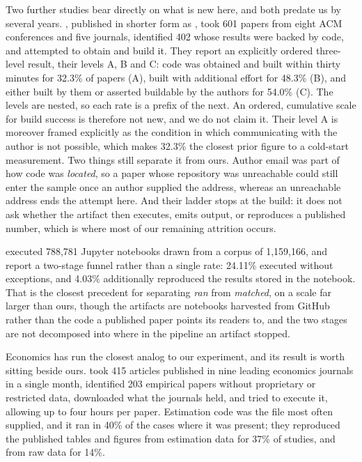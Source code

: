 Two further studies bear directly on what is new here, and both predate us by
several years. \citet{Collberg2015}, published in shorter form as
\citet{CollbergProebsting2016}, took 601 papers from eight ACM conferences and
five journals, identified 402 whose results were backed by code, and attempted to
obtain and build it. They report an explicitly ordered three-level result, their
levels A, B and C: code was obtained and built within thirty minutes for 32.3\%
of papers (A), built with additional effort for 48.3\% (B), and either built by
them or asserted buildable by the authors for 54.0\% (C). The levels are nested,
so each rate is a prefix of the next. An ordered, cumulative scale for build
success is therefore not new, and we do not claim it. Their level A is moreover
framed explicitly as the condition in which communicating with the author is not
possible, which makes 32.3\% the closest prior figure to a cold-start
measurement. Two things still separate it from ours. Author email
was part of how code was \emph{located}, so a paper whose repository was
unreachable could still enter the sample once an author supplied the address,
whereas an unreachable address ends the attempt here. And their ladder stops at
the build: it does not ask whether the artifact then executes, emits output, or
reproduces a published number, which is where most of our remaining attrition
occurs.

\citet{Pimentel2019} executed 788,781 Jupyter notebooks drawn from a corpus of
1,159,166, and report a two-stage funnel rather than a single rate: 24.11\%
executed without exceptions, and 4.03\% additionally reproduced the results
stored in the notebook. That is the closest precedent for separating \emph{ran}
from \emph{matched}, on a scale far larger than ours, though the artifacts are
notebooks harvested from GitHub rather than the code a published paper points its
readers to, and the two stages are not decomposed into where in the pipeline an
artifact stopped.

Economics has run the closest analog to our experiment, and its result is worth
sitting beside ours. \citet{Gertler2018} took 415 articles published in nine
leading economics journals in a single month, identified 203 empirical papers
without proprietary or restricted data, downloaded what the journals held, and
tried to execute it, allowing up to four hours per paper. Estimation code was the
file most often supplied, and it ran in 40\% of the cases where it was present;
they reproduced the published tables and figures from estimation data for 37\% of
studies, and from raw data for 14\%.

